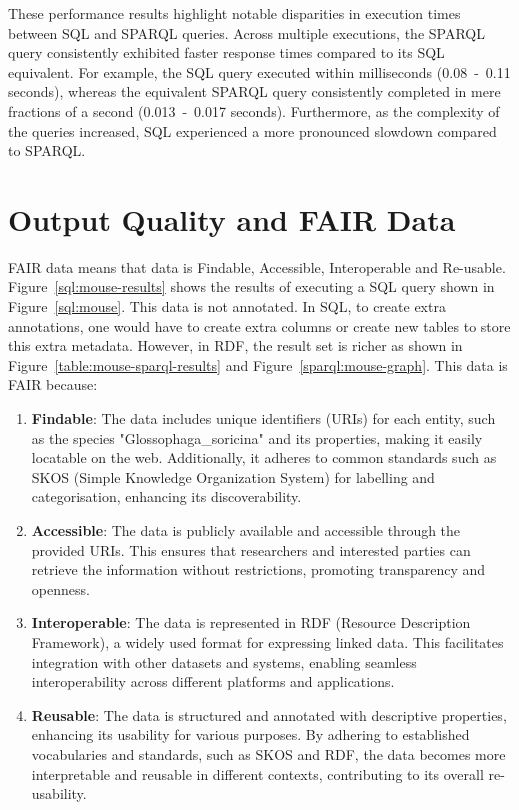 These performance results highlight notable disparities in execution times between SQL and SPARQL queries.  Across multiple executions, the SPARQL query consistently exhibited faster response times compared to its SQL equivalent.  For example, the SQL query executed within milliseconds (0.08~-~0.11 seconds), whereas the equivalent SPARQL query consistently completed in mere fractions of a second (0.013~-~0.017 seconds).  Furthermore, as the complexity of the queries increased, SQL experienced a more pronounced slowdown compared to SPARQL\@.

\section{Output Quality and FAIR Data}

FAIR data means that data is Findable, Accessible, Interoperable and Re-usable.  Figure~\ref{sql:mouse-results} shows the results of executing a SQL query shown in Figure~\ref{sql:mouse}.  This data is not annotated.  In SQL, to create extra annotations, one would have to create extra columns or create new tables to store this extra metadata.  However, in RDF, the result set is richer as shown in Figure~\ref{table:mouse-sparql-results} and Figure~\ref{sparql:mouse-graph}.  This data is FAIR because:

\begin{enumerate}
\item \textbf{Findable}: The data includes unique identifiers (URIs) for each entity, such as the species "Glossophaga\_soricina" and its properties, making it easily locatable on the web. Additionally, it adheres to common standards such as SKOS (Simple Knowledge Organization System) for labelling and categorisation, enhancing its discoverability.
\item \textbf{Accessible}: The data is publicly available and accessible through the provided URIs. This ensures that researchers and interested parties can retrieve the information without restrictions, promoting transparency and openness.
\item \textbf{Interoperable}: The data is represented in RDF (Resource Description Framework), a widely used format for expressing linked data. This facilitates integration with other datasets and systems, enabling seamless interoperability across different platforms and applications.
\item \textbf{Reusable}: The data is structured and annotated with descriptive properties, enhancing its usability for various purposes. By adhering to established vocabularies and standards, such as SKOS and RDF, the data becomes more interpretable and reusable in different contexts, contributing to its overall re-usability.
\end{enumerate}


